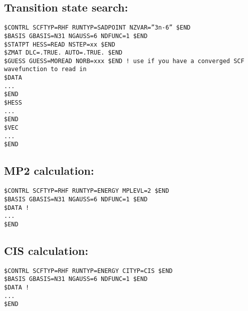 \documentclass[11pt]{article}
\begin{document}
\subsection{Transition state search:}
\label{sec:org96f678c}
\begin{verbatim}
$CONTRL SCFTYP=RHF RUNTYP=SADPOINT NZVAR=”3n-6” $END
$BASIS GBASIS=N31 NGAUSS=6 NDFUNC=1 $END
$STATPT HESS=READ NSTEP=xx $END
$ZMAT DLC=.TRUE. AUTO=.TRUE. $END
$GUESS GUESS=MOREAD NORB=xxx $END ! use if you have a converged SCF wavefunction to read in
$DATA
...
$END
$HESS
...
$END
$VEC
...
$END
\end{verbatim}


\subsection{MP2 calculation:}
\label{sec:org61d90cf}

\begin{verbatim}
$CONTRL SCFTYP=RHF RUNTYP=ENERGY MPLEVL=2 $END
$BASIS GBASIS=N31 NGAUSS=6 NDFUNC=1 $END
$DATA !
...
$END
\end{verbatim}


\subsection{CIS calculation:}
\label{sec:orga264629}

\begin{verbatim}
$CONTRL SCFTYP=RHF RUNTYP=ENERGY CITYP=CIS $END
$BASIS GBASIS=N31 NGAUSS=6 NDFUNC=1 $END
$DATA !
...
$END
\end{verbatim}
\end{document}
